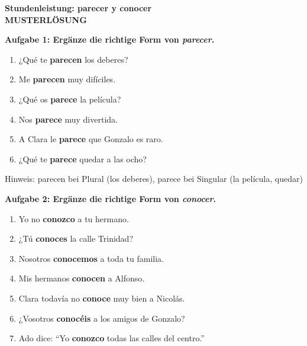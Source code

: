 \documentclass[11pt,a4paper]{article}
\newcommand{\lsg}[1]{\textcolor{loesung}{\textbf{#1}}}
\newcommand{\punktebox}[1]{\hfill\fbox{\small \_/#1}}
\begin{document}
\begin{center}
{\Large\textcolor{fach}{\textbf{Stundenleistung: parecer y conocer}}}\\[0.2cm]
{\textcolor{loesung}{\textbf{MUSTERLÖSUNG}}}
\end{center}

\vspace{0.5cm}

\textbf{Aufgabe 1: Ergänze die richtige Form von \textit{parecer}.} \punktebox{6}

\begin{enumerate}[label=\alph)}]
    \item ¿Qué te \lsg{parecen} los deberes?
    \item Me \lsg{parecen} muy difíciles.
    \item ¿Qué os \lsg{parece} la película?
    \item Nos \lsg{parece} muy divertida.
    \item A Clara le \lsg{parece} que Gonzalo es raro.
    \item ¿Qué te \lsg{parece} quedar a las ocho?
\end{enumerate}

\textcolor{loesung}{\small Hinweis: parecen bei Plural (los deberes), parece bei Singular (la película, quedar)}

\vspace{0.5cm}

\textbf{Aufgabe 2: Ergänze die richtige Form von \textit{conocer}.} \punktebox{7}

\begin{enumerate}[label=\alph)]
    \item Yo no \lsg{conozco} a tu hermano.
    \item ¿Tú \lsg{conoces} la calle Trinidad?
    \item Nosotros \lsg{conocemos} a toda tu familia.
    \item Mis hermanos \lsg{conocen} a Alfonso.
    \item Clara todavía no \lsg{conoce} muy bien a Nicolás.
    \item ¿Vosotros \lsg{conocéis} a los amigos de Gonzalo?
    \item Ado dice: ``Yo \lsg{conozco} todas las calles del centro.''
\end{enumerate}
\end{document}
